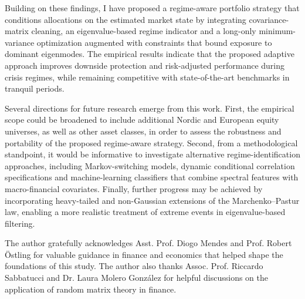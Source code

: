 \documentclass[pdflatex,sn-basic]{sn-jnl}%
\theoremstyle{thmstyleone}%
\theoremstyle{thmstyletwo}%
\theoremstyle{thmstylethree}%
\begin{document}
Building on these findings, I have proposed a regime-aware portfolio strategy that conditions 
allocations on the estimated market state by integrating covariance-matrix cleaning, 
an eigenvalue-based regime indicator and a long-only minimum-variance optimization 
augmented with constraints that bound exposure to dominant eigenmodes. 
The empirical results indicate that the proposed adaptive approach 
improves downside protection and risk-adjusted performance during crisis
regimes, while remaining competitive with state-of-the-art benchmarks in tranquil
periods. 

Several directions for future research emerge from this work. First, the empirical scope 
could be broadened to include additional Nordic and European equity universes, as well as 
other asset classes, in order to assess the robustness and portability of the proposed 
regime-aware strategy. Second, from a methodological standpoint, it would be informative 
to investigate alternative regime-identification approaches, including Markov-switching models, 
dynamic conditional correlation specifications and machine-learning classifiers that combine 
spectral features with macro-financial covariates. Finally, further progress may be achieved 
by incorporating heavy-tailed and non-Gaussian extensions of the Marchenko--Pastur law, 
enabling a more realistic treatment of extreme events in eigenvalue-based filtering.

\backmatter






The author gratefully acknowledges Asst. Prof. Diogo Mendes and Prof. Robert \"{O}stling for valuable guidance in finance and economics that helped shape the foundations of this study. The author also thanks Assoc. Prof. Riccardo Sabbatucci and Dr. Laura Molero Gonz\'{a}lez for helpful discussions on the application of random matrix theory in finance.


\end{document}
